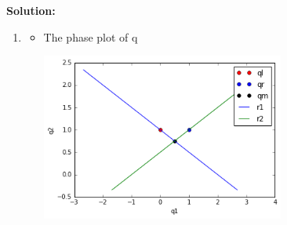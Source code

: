 \documentclass[11pt]{article}
\begin{document}
\vskip 1cm
{\bf Solution:}
\begin{enumerate}[label=(\alph*)]



	\item
	\begin{itemize}
		\item  The phase plot of q
		\begin{minipage}{\linewidth}
			\centering
			\includegraphics[width=8cm]{pha.png}
		\end{minipage}
		

\end{itemize}
\end{enumerate}
\end{document}
